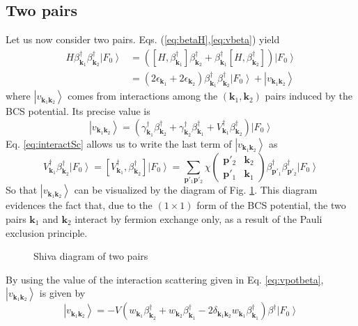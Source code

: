 \documentclass[aps,prb,amsmath,amssymb,superscriptaddress,twocolumn]{revtex4-1}
\newcommand{\vk}{\ensuremath{\mathbf{k}}}
\newcommand{\vp}{\ensuremath{\mathbf{p}}}
\newcommand{\ket}[1]{\ensuremath{\left|#1\right>}}
\newcommand{\br}[1]{\ensuremath{\left(#1\right)}}
\newcommand{\mbr}[1]{\ensuremath{\left[#1\right]}}
\newcommand{\fmtrx}[4]{\ensuremath{\br{\begin{smallmatrix}#1&#2\\#3&#4\end{smallmatrix}}}}
\newcommand{\com}[2]{\ensuremath{\mbr{#1,#2}}}
\newcommand{\fo}{\ensuremath{\ket{F_0}}}
\begin{document}
\subsection{Two pairs}
Let us now consider two pairs.  Eqs. (\ref{eq:betaH},\ref{eq:vbeta})  yield 
\begin{equation}\label{eq:SchTwo}
\begin{split}
H\beta^{\dagger}_{\vk_1}\beta^{\dagger}_{\vk_2}\fo
&=\br{\com{H}{\beta^{\dagger}_{\vk_1}}\beta^{\dagger}_{\vk_2}+\beta^{\dagger}_{\vk_1}\com{H}{\beta^{\dagger}_{\vk_2}}}\fo\\
&=\br{2\epsilon_{\vk_1}+2\epsilon_{\vk_2}}\beta^{\dagger}_{\vk_1}\beta^{\dagger}_{\vk_2}\fo+\ket{v_{\vk_1\vk_2}}
\end{split}
\end{equation}
where $\ket{v_{\vk_1\vk_2}}$ comes from interactions among the $\br{\vk_1,\vk_2}$ pairs induced by the BCS potential.  Its precise value is 
\begin{equation}
\ket{v_{\vk_1\vk_2}}=\br{\gamma^{\dagger}_{\vk_1}\beta^{\dagger}_{\vk_2}+\gamma^{\dagger}_{\vk_2}\beta^{\dagger}_{\vk_1}+V^{\dagger}_{\vk_1}\beta^{\dagger}_{\vk_2}}\fo
\end{equation}
Eq. \eqref{eq:interactSc} allows us to write the last term of $\ket{v_{\vk_1\vk_2}}$ as 
\begin{equation}
V^{\dagger}_{\vk_1}\beta^{\dagger}_{\vk_2}\fo=\com{V^{\dagger}_{\vk_1}}{\beta^{\dagger}_{\vk_2}}\fo=
\sum_{\vp'_1\vp'_2}\chi\fmtrx{\vp'_2}{\vk_2}{\vp'_1}{\vk_1}\beta^{\dagger}_{\vp'_1}\beta^{\dagger}_{\vp'_2}\fo
\end{equation}
So that  $\ket{v_{\vk_1\vk_2}}$ can be visualized by the diagram of Fig. \ref{fig:twoP}. This diagram evidences the fact that, due to the $(1\times1)$ form of the BCS potential, the two pairs $\vk_1$ and $\vk_2$ interact by fermion exchange only, as a result of the Pauli exclusion principle. 

\begin{figure}[htb]
 \caption{Shiva diagram of two pairs \label{fig:twoP}}
\end{figure}

By using the value of the interaction scattering given in Eq. \eqref{eq:vpotbeta},   $\ket{v_{\vk_1\vk_2}}$ is given by
\begin{equation}
\ket{v_{\vk_1\vk_2}}=-V\br{w_{\vk_1}\beta^{\dagger}_{\vk_2}+w_{\vk_2}\beta^{\dagger}_{\vk_1}-2\delta_{\vk_1\vk_2}w_{\vk_1}\beta^{\dagger}_{\vk_1}}\beta^{\dagger}\fo
\end{equation}
\end{document}
